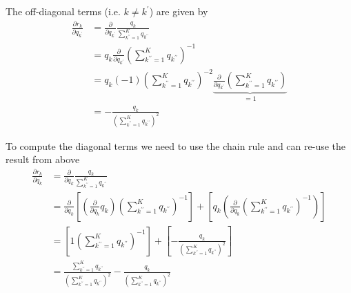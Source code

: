 \documentclass[oneside]{article}
\begin{document}
The off-diagonal terms (i.e. $k \neq k^\prime$) are given by
\begin{equation}
    \begin{aligned}
        \frac{\partial r_k}{\partial q_{k^\prime}}
        &= \frac{\partial}{\partial q_{k^\prime}} \frac{{q_k}}{\sum_{k^{\prime \prime}=1}^K {q}_{k^{\prime \prime}}} \\
        &= {q_k}  \frac{\partial}{\partial q_{k^\prime}} \left(\sum_{k^{\prime \prime}=1}^K {q}_{k^{\prime \prime}} \right)^{-1} \\
        &= {q_k} (-1)\left(\sum_{k^{\prime \prime}=1}^K {q}_{k^{\prime \prime}} \right)^{-2} \underbrace{\frac{\partial}{\partial q_{k^\prime}} \left(\sum_{k^{\prime \prime}=1}^K {q}_{k^{\prime \prime}} \right)}_{=1} \\
        &= - \frac{q_k}{\left(\sum_{k^{\prime \prime}=1}^K {q}_{k^{\prime \prime}} \right)^{2}}
    \end{aligned}
\end{equation}

To compute the diagonal terms we need to use the chain rule and can re-use the result from above
\begin{equation}
    \begin{aligned}
        \frac{\partial r_k}{\partial q_{k}}
        &= \frac{\partial}{\partial q_{k}} \frac{{q_k}}{\sum_{k^{\prime \prime}=1}^K {q}_{k^{\prime \prime}}} \\
        &= \frac{\partial}{\partial q_{k}} \left[\left(\frac{\partial}{\partial q_{k}} q_k \right) \left(\sum_{k^{\prime \prime}=1}^K {q}_{k^{\prime \prime}} \right)^{-1} \right]
        + \left[ q_{k} \left(\frac{\partial}{\partial q_{k}} \left(\sum_{k^{\prime \prime}=1}^K {q}_{k^{\prime \prime}} \right)^{-1} \right) \right] \\
        &= \left[ 1 \left(\sum_{k^{\prime \prime}=1}^K {q}_{k^{\prime \prime}} \right)^{-1}\right] + \left[ - \frac{q_k}{\left(\sum_{k^{\prime \prime}=1}^K {q}_{k^{\prime \prime}} \right)^{2}} \right] \\
        &= \frac{\sum_{k^{\prime \prime}=1}^K {q}_{k^{\prime \prime}}}{\left(\sum_{k^{\prime \prime}=1}^K {q}_{k^{\prime \prime}} \right)^{2}}
        - \frac{q_k}{\left(\sum_{k^{\prime \prime}=1}^K {q}_{k^{\prime \prime}} \right)^{2}} \\
    \end{aligned}
\end{equation}
\end{document}

